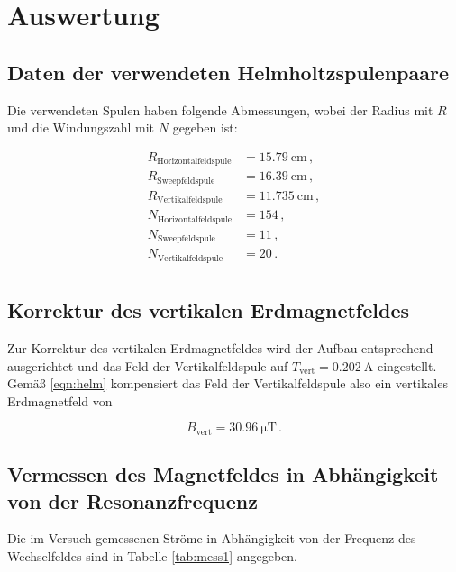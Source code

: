 \section{Auswertung}
\label{sec:Auswertung}

\subsection{Daten der verwendeten Helmholtzspulenpaare}

Die verwendeten Spulen haben folgende Abmessungen, wobei der Radius mit $R$ und die Windungszahl mit $N$ gegeben ist:

\begin{align*}
  R_\text{Horizontalfeldspule} &= \SI{15.79}{\centi\meter}\,,\\
  R_\text{Sweepfeldspule} &= \SI{16.39}{\centi\meter}\,,\\
  R_\text{Vertikalfeldspule} &= \SI{11.735}{\centi\meter}\,,\\
  N_\text{Horizontalfeldspule} &= \num{154}\,,\\
  N_\text{Sweepfeldspule} &= \num{11}\,,\\
  N_\text{Vertikalfeldspule} &= \num{20}\,.\\  
\end{align*}

\subsection{Korrektur des vertikalen Erdmagnetfeldes}

Zur Korrektur des vertikalen Erdmagnetfeldes wird der Aufbau entsprechend \label{sec:Durchführung} ausgerichtet und das Feld der Vertikalfeldspule auf $T_\text{vert} = \SI{0.202}{\ampere}$
eingestellt. Gemäß \eqref{eqn:helm} kompensiert das Feld der Vertikalfeldspule also ein vertikales Erdmagnetfeld von 

\begin{equation*}
  B_\text{vert} = \SI{30.96}{\micro\tesla}\,.
\end{equation*}

\subsection{Vermessen des Magnetfeldes in Abhängigkeit von der Resonanzfrequenz}

Die im Versuch gemessenen Ströme in Abhängigkeit von der Frequenz des Wechselfeldes sind in Tabelle \ref{tab:mess1} angegeben.

